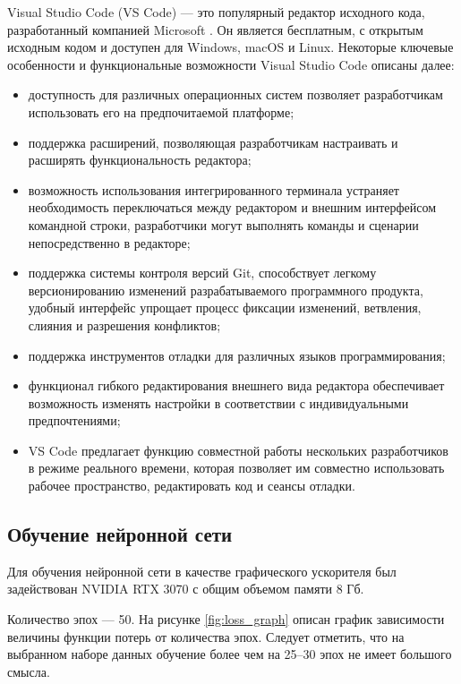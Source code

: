 Visual Studio Code (VS Code) --- это популярный редактор исходного кода, разработанный компанией Microsoft \cite{vscode}. Он является бесплатным, с открытым исходным кодом и доступен для Windows, macOS и Linux. Некоторые ключевые особенности и функциональные возможности Visual Studio Code описаны далее:
\begin{itemize}
    \item доступность для различных операционных систем позволяет разработчикам использовать его на предпочитаемой платформе;
    \item поддержка расширений, позволяющая разработчикам настраивать и расширять функциональность редактора;
    \item возможность использования интегрированного терминала устраняет необходимость переключаться между редактором и внешним интерфейсом командной строки, разработчики могут выполнять команды и сценарии непосредственно в редакторе;
    \item поддержка системы контроля версий Git, способствует легкому версионированию изменений разрабатываемого программного продукта, удобный интерфейс упрощает процесс фиксации изменений, ветвления, слияния и разрешения конфликтов;
    \item поддержка инструментов отладки для различных языков программирования;
    \item функционал гибкого редактирования внешнего вида редактора обеспечивает возможность изменять настройки в соответствии с индивидуальными предпочтениями;
    \item VS Code предлагает функцию совместной работы нескольких разработчиков в режиме реального времени, которая позволяет им совместно использовать рабочее пространство, редактировать код и сеансы отладки.
\end{itemize}

\subsection{Обучение нейронной сети}

Для обучения нейронной сети в качестве графического ускорителя был задействован NVIDIA RTX 3070 с общим объемом памяти 8 Гб. 

Количество эпох --- 50. На рисунке \ref{fig:loss_graph} описан график зависимости величины функции потерь от количества эпох. Следует отметить, что на выбранном наборе данных обучение более чем на 25--30 эпох не имеет большого смысла.

